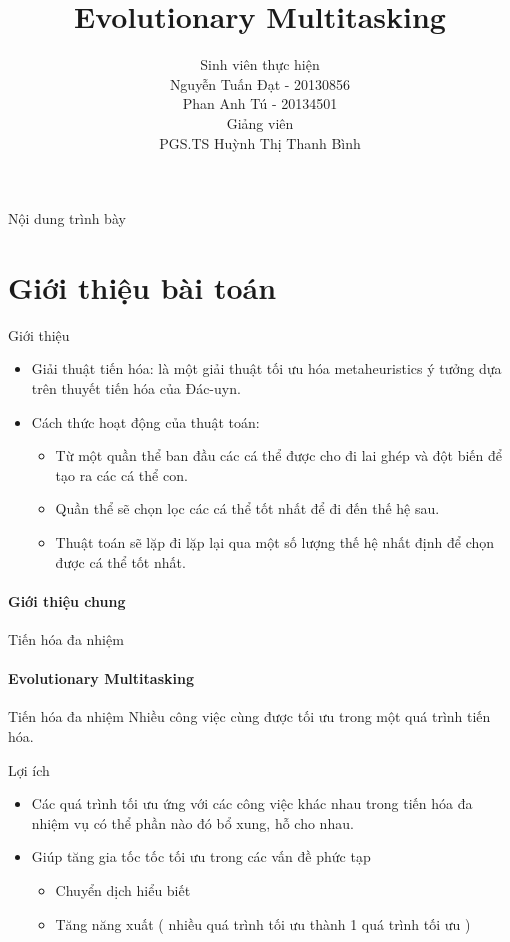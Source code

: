 \documentclass[compress]{beamer}
\title[Evolutionary Multitasking]{Evolutionary Multitasking}
\author[Nguyễn Tuấn Đạt, Phan Anh Tú (SoICT-HUST)]{
Sinh viên thực hiện\\
Nguyễn Tuấn Đạt - 20130856 \\
Phan Anh Tú - 20134501 \\[0.5cm]
Giảng viên \\
PGS.TS Huỳnh Thị Thanh Bình
}
\begin{document}
\begin{frame}[plain]
\titlepage
\end{frame}

\begin{frame}[plain]{Nội dung trình bày}
\tableofcontents
\end{frame}

\section{Giới thiệu bài toán}

\begin{frame}{Giới thiệu}
\begin{itemize}
\item Giải thuật tiến hóa: là một giải thuật tối ưu hóa metaheuristics ý tưởng dựa trên thuyết tiến hóa của Đác-uyn.
\pause
\item Cách thức hoạt động của thuật toán:
\pause
\begin{itemize}
\item Từ một quần thể ban đầu các cá thể được cho đi lai ghép và đột biến để tạo ra các cá thể con.
\item Quần thể sẽ chọn lọc các cá thể tốt nhất để đi đến thế hệ sau.
\item Thuật toán sẽ lặp đi lặp lại qua một số lượng thế hệ nhất định để chọn được cá thể tốt nhất.
\end{itemize}
\end{itemize}
\framesubtitle{Giới thiệu chung}
\end{frame}
\begin{frame}{Tiến hóa đa nhiệm}
\framesubtitle{Evolutionary Multitasking}
\begin{block}{Tiến hóa đa nhiệm}
Nhiều công việc cùng được tối ưu trong một quá trình tiến hóa.
\end{block}
\pause
\begin{block}{Lợi ích}
\begin{itemize}
\item Các quá trình tối ưu ứng với các công việc khác nhau trong tiến hóa đa nhiệm vụ có thể phần nào đó bổ xung, hỗ cho nhau.
\item Giúp tăng gia tốc tốc tối ưu trong các vấn đề phức tạp
\begin{itemize}
\item Chuyển dịch hiểu biết
\item Tăng năng xuất ( nhiều quá trình tối ưu thành 1 quá trình tối ưu )
\end{itemize}
\end{itemize}
\end{block}

\end{frame}
\end{document}
